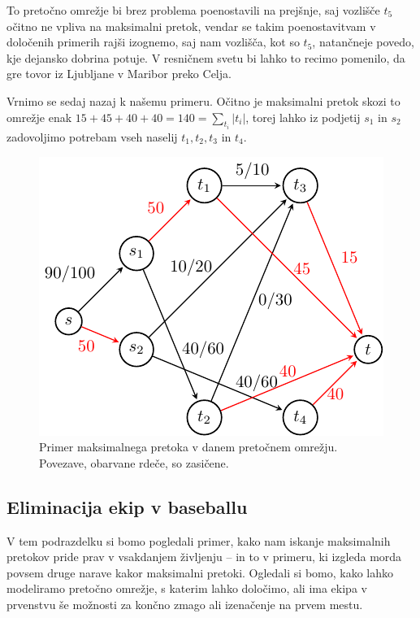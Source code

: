 \documentclass[mat1]{fmfdelo}
\begin{document}
To pretočno omrežje bi brez problema poenostavili na prejšnje, saj vozlišče $t_5$ očitno ne vpliva na maksimalni pretok, vendar se takim poenostavitvam v določenih primerih
rajši izognemo, saj nam vozlišča, kot so $t_5$, natančneje povedo, kje dejansko dobrina potuje. V resničnem svetu bi lahko to recimo pomenilo, da gre tovor iz Ljubljane
v Maribor preko Celja.

Vrnimo se sedaj nazaj k našemu primeru. Očitno je maksimalni pretok skozi to omrežje enak $15 + 45 + 40 + 40 = 140 = \sum_{t_i} |t_i|$, torej lahko iz podjetij $s_1$ in $s_2$
zadovoljimo potrebam vseh naselij $t_1, t_2, t_3$ in $t_4$.

\begin{figure}[H]
  \centering
  \includegraphics{images/primer1-3.pdf}
  \caption{Primer maksimalnega pretoka v danem pretočnem omrežju. Povezave, obarvane rdeče, so zasičene.}
\end{figure}


\subsection{Eliminacija ekip v baseballu}

V tem podrazdelku si bomo pogledali primer, kako nam iskanje maksimalnih pretokov pride prav v vsakdanjem življenju -- in to v primeru, ki izgleda morda povsem druge narave kakor maksimalni pretoki. Ogledali si bomo, kako lahko modeliramo pretočno omrežje, s katerim lahko določimo, ali ima ekipa v prvenstvu še možnosti za končno zmago ali izenačenje na prvem mestu.\\
\end{document}
